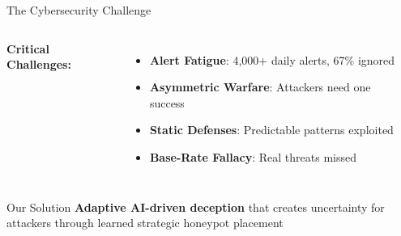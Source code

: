 \documentclass[aspectratio=169,xcolor=dvipsnames]{beamer}
\begin{document}
\begin{frame}{The Cybersecurity Challenge}
\begin{columns}[c]
\textbf{\textcolor{cwAlert}{Critical Challenges:}}
\begin{itemize}
    \item \textbf{Alert Fatigue}: 4,000+ daily alerts, 67\% ignored
    \item \textbf{Asymmetric Warfare}: Attackers need one success
    \item \textbf{Static Defenses}: Predictable patterns exploited
    \item \textbf{Base-Rate Fallacy}: Real threats missed
\end{itemize}

\begin{center}
\end{center}
\end{columns}

\vspace{0.5cm}
\begin{alertblock}{Our Solution}
\textbf{Adaptive AI-driven deception} that creates uncertainty for attackers through learned strategic honeypot placement
\end{alertblock}
\end{frame}
\end{document}

